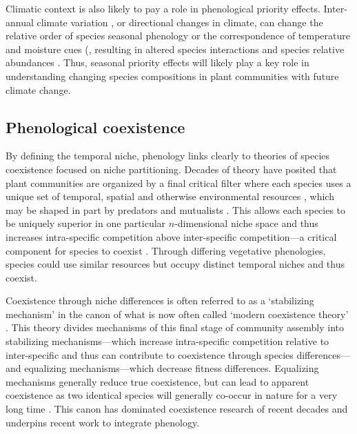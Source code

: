 \documentclass[11pt]{article}
\begin{document}
Climatic context is also likely to pay a role in phenological priority effects. Inter-annual climate variation \citep{levine2011seasonal}, or directional changes in climate, can change the relative order of species seasonal phenology or the correspondence of temperature and moisture cues (\cite{kimball2010contemporary}, resulting in altered species interactions and species relative abundances \citep{thomson2017between,kimball2010contemporary,buonaiuto2023contrasting}. Thus, seasonal priority effects will likely play a key role in understanding changing species compositions in plant communities with future climate change.

\subsection*{Phenological coexistence}

By defining the temporal niche, phenology links clearly to theories of species coexistence focused on niche partitioning. Decades of theory have posited that plant communities are organized by a final critical filter where each species uses a unique set of temporal, spatial and otherwise environmental resources \citep{Hutchinson:1959xi}, which may be shaped in part by predators and mutualists \citep{mcpeek2022coexistence}. This allows each species to be uniquely superior in one particular $n$-dimensional niche space and thus increases intra-specific competition above inter-specific competition---a critical component for species to coexist \citep{Chesson:2000vd,hillerislambers2012rethinking,mcpeek2022coexistence}. Through differing vegetative phenologies, species could use similar resources but occupy distinct temporal niches and thus coexist. 

Coexistence through niche differences is often referred to as a `stabilizing mechanism' in the canon of what is now often called `modern coexistence theory' \citep{Chesson:2000vd}. This theory divides mechanisms of this final stage of community assembly into stabilizing mechanisms---which increase intra-specific competition relative to inter-specific and thus can contribute to coexistence through species differences---and equalizing mechanisms---which decrease fitness differences. Equalizing mechanisms generally reduce true coexistence, but can lead to apparent coexistence as two identical species will generally co-occur in nature for a very long time  \citep[until one is lost to stochasticity,][]{Hubbell:2001vo}. This canon has dominated coexistence research of recent decades and underpins recent work to integrate phenology.
\end{document}
